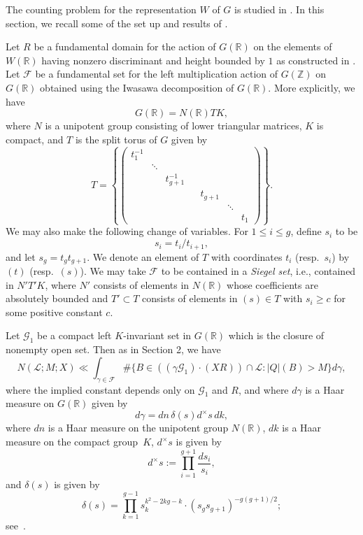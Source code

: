 \documentclass[11pt]{article}
\def\Z{{\mathbb Z}}
\def\R{{\mathbb R}}
\def\FF{{\mathcal F}}
\def\Z{{\mathbb Z}}
\def\GG{{\mathcal G}}
\def\LL{{\mathcal L}}
\begin{document}
The counting problem for the representation $W$ of $G$ is studied in \cite{SW}. In this section, we recall some of the set up and results of \cite{SW}.

Let $R$ be a fundamental domain for the action of $G(\R)$ on the elements of $W(\R)$ having nonzero discriminant and height bounded by $1$ as constructed in \cite[\S4.1]{SW}. Let $\FF$ be a fundamental set for the left multiplication action of $G(\Z)$ on $G(\R)$ obtained using the Iwasawa decomposition of $G(\R)$. More explicitly, we have
$$
G(\R)=N(\R)TK,
$$ where $N$ is a unipotent group consisting of lower triangular matrices, $K$ is compact, and $T$ is the split torus of $G$ given by
\begin{equation*}
T=
\left\{\left(\begin{array}{ccccccc}
 t_1^{-1}&&&&&&\\
&\ddots &&&&&  \\
 && t_{g+1}^{-1} &&&&\\
 &&&& \!\!\!\!t_{g+1} &&\\
&&&&&\!\!\!\!\ddots &  \\
& &&&&& \!\!t_{1}
\end{array}\right)\right\}.
\end{equation*}
We may also make the following change of variables.
For $1\leq
i\leq g$, define $s_i$ to be
$$
s_i=t_i/t_{i+1},
$$
and let $s_g=t_gt_{g+1}$.
We denote an element of $T$ with coordinates $t_i$
(resp.\ $s_i$) by $(t)$ (resp.\ $(s)$). We may take $\FF$ to be contained in a {\it Siegel set}, i.e., contained in $N'T'K$,
where $N'$ consists of elements in $N(\R)$ whose coefficients are
absolutely bounded and $T'\subset T$ consists of elements in $(s)\in
T$ with $s_i\geq c$ for some positive constant $c$.

Let $\GG_1$ be a compact left $K$-invariant set in $G(\R)$ which is the closure of nonempty open set. Then as in Section 2, we have
\begin{equation}
  N(\LL;M;X)\ll \int_{\gamma\in\FF} \#\{B\in((\gamma \GG_1)\cdot (XR))\cap\LL:|Q|(B)>M\}
  d\gamma,
\end{equation}
where the implied constant depends only on $\GG_1$ and $R$, and where $d\gamma$ is a Haar measure on $G(\R)$ given by
$$
d\gamma=dn\,\delta(s)d^\times s\,dk,
$$ where $dn$ is a Haar measure on the unipotent group $N(\R)$,
$dk$ is a Haar measure on the compact group~$K$, $d^\times s$ is
given by
$$
d^\times s:=\prod_{i=1}^{g+1}\frac{ds_i}{s_i},
$$
and
$\delta(s)$ is given by
\begin{equation}\label{eqhaareven}
  \delta(s)=\prod_{k=1}^{g-1} s_k^{k^2-2kg-k}\cdot (s_gs_{g+1})^{-g(g+1)/2};
\end{equation}
see~\cite[(20)]{SW}.
\end{document}
